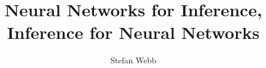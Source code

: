 
\correctionstrue

\usepackage{natbib}

\renewcommand*{\bibfont}{\small}
\setlength{\bibsep}{1pt}

\title{\vspace{20pt}Neural Networks for Inference,\\ Inference for Neural Networks}
\author{Stefan Webb}


\usepackage{microtype}

\usepackage{times}
\usepackage{graphicx} %
\usepackage{subcaption} 
\usepackage{tikz}
\usetikzlibrary{fit}					%
\usetikzlibrary{backgrounds}	%
\usepackage{setspace}
\usepackage{pdfpages}

\usepackage{cancel}




\usepackage{amsthm}
\usepackage{dsfont}
\usepackage{amssymb,amsmath}
\usepackage{bbm}


